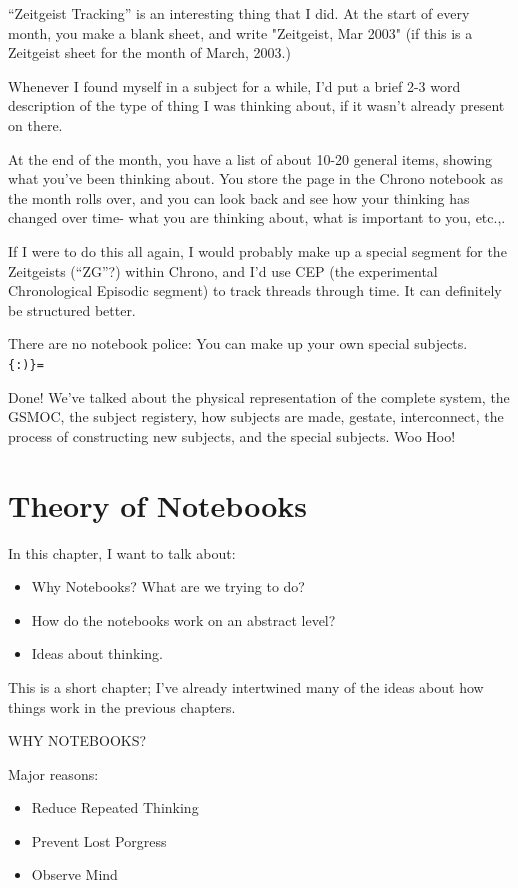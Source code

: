 \documentclass[oneside]{book}
\begin{document}
``Zeitgeist Tracking'' is an interesting thing that I did. At the start
of every month, you make a blank sheet, and write "Zeitgeist, Mar
2003" (if this is a Zeitgeist sheet for the month of March, 2003.)

Whenever I found myself in a subject for a while, I'd put a brief
2-3 word description of the type of thing I was thinking about, if
it wasn't already present on there.

At the end of the month, you have a list of about 10-20 general items,
showing what you've been thinking about. You store the page in the
Chrono notebook as the month rolls over, and you can look back and see
how your thinking has changed over time- what you are thinking about,
what is important to you, etc.,.

If I were to do this all again, I would probably make up a special
segment for the Zeitgeists (``ZG''?) within Chrono, and I'd use CEP (the
experimental Chronological Episodic segment) to track threads through
time. It can definitely be structured better.

There are no notebook police: You can make up your own special
subjects. \verb| {:)}= |

Done! We've talked about the physical representation of the complete
system, the GSMOC, the subject registery, how subjects are made,
gestate, interconnect, the process of constructing new subjects, and
the special subjects. Woo Hoo!

\chapter{Theory of Notebooks}

In this chapter, I want to talk about:

\begin{itemize}
\item Why Notebooks? What are we trying to do?
\item How do the notebooks work on an abstract level?
\item Ideas about thinking.
\end{itemize}

This is a short chapter; I've already intertwined many of the ideas
about how things work in the previous chapters.

WHY NOTEBOOKS?

Major reasons:

\begin{itemize}
\item Reduce Repeated Thinking
\item Prevent Lost Porgress
\item Observe Mind
\end{itemize}
\end{document}
